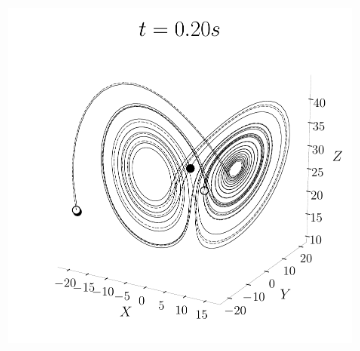 \begin{figure}[H]
\begin{subfigure}{.5\textwidth}
    \includegraphics[width=1.\linewidth, angle=0, clip]{03_Cap3/figures/Lorenzatractor0_20.pdf}
    \end{subfigure}
    \vspace{-0.5cm}
\end{figure}
